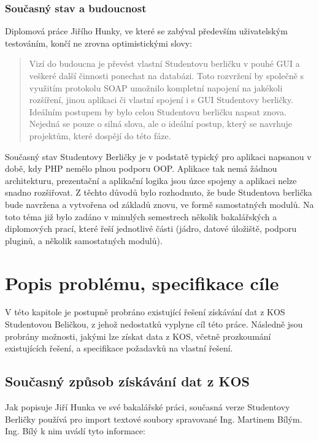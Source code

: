 \documentclass[11pt,twoside,a4paper]{book}
\begin{document}
\subsection{Současný stav a budoucnost}

Diplomová práce Jiřího Hunky, ve které se zabýval především uživatelským testováním, končí ne zrovna optimistickými slovy: 
\begin{quotation}
Vizí do budoucna je převést vlastní Studentovu berličku v pouhé GUI a
veškeré další činnosti ponechat na databázi. Toto rozvržení by společně
s využitím protokolu SOAP umožnilo kompletní napojení na jakékoli rozšíření, jinou aplikaci či vlastní spojení i s GUI Studentovy berličky.
Ideálním postupem by bylo celou Studentovu berličku napsat znova. Nejedná se pouze o silná slova, ale o ideální postup, který se navrhuje projektům, které dospějí do této fáze.
\end{quotation}

Současný stav Studentovy Berličky je v podstatě typický pro aplikaci napsanou v době, kdy PHP nemělo plnou podporu OOP. Aplikace tak nemá žádnou architekturu, prezentační a aplikační logika jsou úzce spojeny a aplikaci nelze snadno rozšiřovat. Z těchto důvodů bylo rozhodnuto, že bude Studentova berlička bude navržena a vytvořena od základů znovu, ve formě samostatných modulů. Na toto téma již bylo zadáno v minulých semestrech několik bakalářských a diplomových prací, které řeší jednotlivé části (jádro, datové úložiště, podporu pluginů, a několik samostatných modulů).



\chapter{Popis problému, specifikace cíle}
\label{popis}
V této kapitole je postupně probráno existující řešení získávání dat z KOS Studentovou Beličkou, z jehož nedostatků vyplyne cíl této práce. Následně jsou probrány možnosti, jakými lze získat data z KOS, včetně prozkoumání existujících řešení, a specifikace požadavků na vlastní řešení.  

\section{Současný způsob získávání dat z KOS}
Jak popisuje Jiří Hunka ve své bakalářské práci\cite{hunka:bp}, současná verze Studentovy Berličky používá pro import textové soubory spravované Ing. Martinem Bílým. Ing. Bílý k nim uvádí tyto informace:
\end{document}
